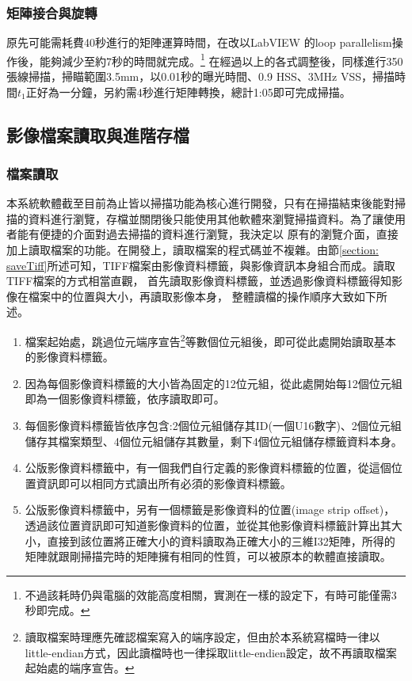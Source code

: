 \documentclass[12pt]{article}
\begin{document}
\subsubsection{矩陣接合與旋轉}
原先可能需耗費40秒進行的矩陣運算時間，在改以LabVIEW 的loop parallelism操作後，能夠減少至約7秒的時間就完成。\footnote{不過該耗時仍與電腦的效能高度相關，實測在一樣的設定下，有時可能僅需3秒即完成。}
在經過以上的各式調整後，同樣進行350張線掃描，掃瞄範圍3.5mm，以0.01秒的曝光時間、0.9 HSS、3MHz VSS，掃描時間$t_1$正好為一分鐘，另約需4秒進行矩陣轉換，總計1:05即可完成掃描。

\subsection{影像檔案讀取與進階存檔}
\subsubsection{檔案讀取}
本系統軟體截至目前為止皆以掃描功能為核心進行開發，只有在掃描結束後能對掃描的資料進行瀏覽，存檔並關閉後只能使用其他軟體來瀏覽掃描資料。為了讓使用者能有便捷的介面對過去掃描的資料進行瀏覽，我決定以
原有的瀏覽介面，直接加上讀取檔案的功能。在開發上，讀取檔案的程式碼並不複雜。由節\ref{section: saveTiff}所述可知，TIFF檔案由影像資料標籤，與影像資訊本身組合而成。讀取TIFF檔案的方式相當直觀，
首先讀取影像資料標籤，並透過影像資料標籤得知影像在檔案中的位置與大小，再讀取影像本身，
整體讀檔的操作順序大致如下所述。
\begin{enumerate}
    \item 檔案起始處，跳過位元端序宣告\footnote{讀取檔案時理應先確認檔案寫入的端序設定，但由於本系統寫檔時一律以little-endian方式，因此讀檔時也一律採取little-endien設定，故不再讀取檔案起始處的端序宣告。}等數個位元組後，即可從此處開始讀取基本的影像資料標籤。
    \item 因為每個影像資料標籤的大小皆為固定的12位元組，從此處開始每12個位元組即為一個影像資料標籤，依序讀取即可。
    \item 每個影像資料標籤皆依序包含:2個位元組儲存其ID(一個U16數字)、2個位元組儲存其檔案類型、4個位元組儲存其數量，剩下4個位元組儲存標籤資料本身。
    \item 公版影像資料標籤中，有一個我們自行定義的影像資料標籤的位置，從這個位置資訊即可以相同方式讀出所有必須的影像資料標籤。
    \item 公版影像資料標籤中，另有一個標籤是影像資料的位置(image strip offset)，透過該位置資訊即可知道影像資料的位置，並從其他影像資料標籤計算出其大小，直接到該位置將正確大小的資料讀取為正確大小的三維I32矩陣，所得的矩陣就跟剛掃描完時的矩陣擁有相同的性質，可以被原本的軟體直接讀取。
\end{enumerate}
\end{document}
